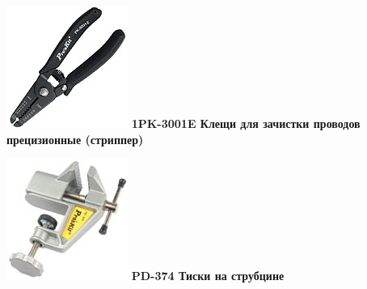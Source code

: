 \documentclass{magazine}
\begin{document}
{\noindent\includegraphics[width=\columnwidth]{fig/00/pros/1PK-3001E.jpg}
\textbf{1PK-3001E Клещи для зачистки проводов прецизионные (стриппер)}

\noindent\includegraphics[width=\columnwidth]{fig/00/pros/PD-374.jpg}
\textbf{PD-374 Тиски на струбцине}

}
\end{document}
